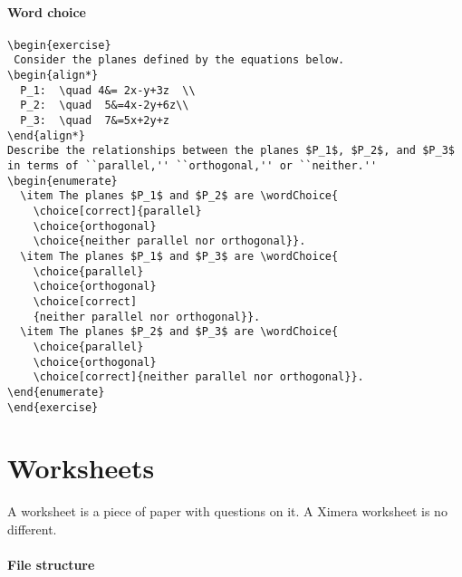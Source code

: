 \documentclass{ximera}
\begin{document}
\paragraph{Word choice}
\begin{verbatim}
\begin{exercise}
 Consider the planes defined by the equations below.
\begin{align*}
  P_1:  \quad 4&= 2x-y+3z  \\
  P_2:  \quad  5&=4x-2y+6z\\ 
  P_3:  \quad  7&=5x+2y+z
\end{align*}
Describe the relationships between the planes $P_1$, $P_2$, and $P_3$
in terms of ``parallel,'' ``orthogonal,'' or ``neither.''
\begin{enumerate}
  \item The planes $P_1$ and $P_2$ are \wordChoice{
    \choice[correct]{parallel}
    \choice{orthogonal}
    \choice{neither parallel nor orthogonal}}.
  \item The planes $P_1$ and $P_3$ are \wordChoice{
    \choice{parallel}
    \choice{orthogonal}
    \choice[correct]
    {neither parallel nor orthogonal}}.
  \item The planes $P_2$ and $P_3$ are \wordChoice{
    \choice{parallel}
    \choice{orthogonal}
    \choice[correct]{neither parallel nor orthogonal}}.
\end{enumerate}
\end{exercise}
\end{verbatim}






\section{Worksheets}

A worksheet is a piece of paper with questions on it. A Ximera worksheet is no
different.

\paragraph{File structure}
\end{document}
